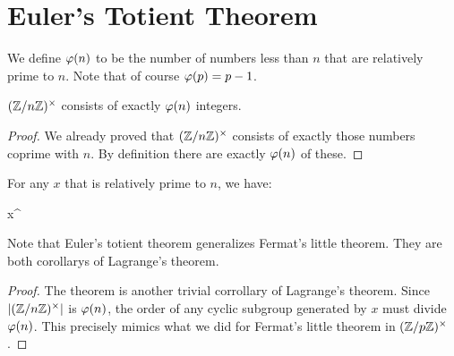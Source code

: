 \section{Euler's Totient Theorem}

\begin{definition}
  We define  $\varphi\mathopen{}\left( {n} \right)\mathclose{}$ to be the
  number of numbers less than $n$ that are relatively prime to $n$. Note
  that of course $\varphi\mathopen{}\left( {p} \right)\mathclose{} = p - 1$.
\end{definition}

\begin{proposition}
  $\mathopen{}\left( {\mathbb{Z} / n\mathbb{Z}} \right)\mathclose{}^\times$ consists of exactly $\varphi\mathopen{}\left( {n} \right)\mathclose{}$ integers.
\end{proposition}

\begin{proof}
  We already proved that $\mathopen{}\left( {\mathbb{Z} / n\mathbb{Z}} \right)\mathclose{}^\times$ consists of exactly those numbers
  coprime with $n$. By definition there are exactly $\varphi\mathopen{}\left( {n} \right)\mathclose{}$ of
  these.
\end{proof}

\begin{theorem} For any $x$ that is relatively
  prime to $n$, we have:

  \begin{nedqn}
    x^{}
   
  \end{nedqn}
\end{theorem}

\begin{remark}
  Note that Euler's totient theorem generalizes Fermat's little theorem.
  They are both corollarys of Lagrange's theorem.
\end{remark}

\begin{proof}
  The theorem is another trivial corrollary of Lagrange's theorem. Since
  $|\mathopen{}\left( {\mathbb{Z} / n\mathbb{Z}} \right)\mathclose{}^\times|$ is $\varphi\mathopen{}\left( {n} \right)\mathclose{}$, the order of any cyclic subgroup
  generated by $x$ must divide $\varphi\mathopen{}\left( {n} \right)\mathclose{}$. This precisely mimics what
  we did for Fermat's little theorem in $\mathopen{}\left( {\mathbb{Z} / p\mathbb{Z}} \right)\mathclose{}^\times$.
\end{proof}
